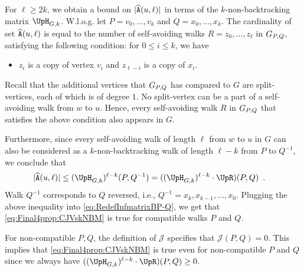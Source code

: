 \documentclass[11pt,reqno]{amsart}
\numberwithin{equation}{section}
\newcommand{\applegreen}[1]{ {\color{applegreen}#1}}
\newcommand{\amethyst}[1]{{\color{amethyst}#1} }
\newcommand{\blue}[1]{{\color{blue}#1}}
\newcommand{\bluepigment}[1]{{\color{blue(pigment)}#1}}
\newcommand{\bostonuniversityred}[1]{{\color{bostonuniversityred}#1}}
\newcommand{\capri}[1]{{\color{capri}#1}}
\newcommand{\cadmiumgreen}[1]{{\color{cadmiumgreen}#1}}
\newcommand{\electricviolet}[1]{{\color{electricviolet}#1}}
\newcommand{\goldenbrown}[1]{{\color{goldenbrown}#1}}
\newcommand{\heliotrope}[1]{{\color{heliotrope}#1}}
\newcommand{\red}[1]{{\color{red}#1}}
\newcommand{\scp}{\widehat{\tt A}}
\newcommand{\abs}[1]{\blue{|}#1\blue{|}}
\newcommand{\NBMatrix}{\cadmiumgreen{\UpH}_{G,\kk}}
\newcommand{\Invol}{\UpR}
\renewcommand{\applegreen}[1]{#1}
\renewcommand{\amethyst}[1]{#1}
\renewcommand{\blue}[1]{#1}
\renewcommand{\bluepigment}[1]{#1}
\renewcommand{\bostonuniversityred}[1]{#1}
\renewcommand{\capri}[1]{#1}
\renewcommand{\cadmiumgreen}[1]{#1}
\renewcommand{\electricviolet}[1]{#1}
\renewcommand{\goldenbrown}[1]{#1}
\renewcommand{\heliotrope}[1]{#1}
\renewcommand{\red}[1]{#1}
\newcommand{\ki}{\capri{i}}
\newcommand{\kk}{\bluepigment{k}}
\newcommand{\kell}{{\color{green(pigment)}\ell}}%
\newcommand{\kP}{\goldenbrown{P}}
\newcommand{\kQ}{\amethyst{Q}}
\newcommand{\kR}{\bostonuniversityred{R}}%
\newcommand{\ku}{\red{u}}
\newcommand{\kv}{\electricviolet{v}}
\newcommand{\kw}{\blue{w}}
\newcommand{\kx}{\heliotrope{x}}
\newcommand{\kz}{\cadmiumgreen{z}}
\renewcommand{\ki}{i}
\renewcommand{\kk}{k}
\renewcommand{\kell}{\ell}
\renewcommand{\kP}{P}
\renewcommand{\kQ}{Q}
\renewcommand{\kR}{R}
\renewcommand{\ku}{u}
\renewcommand{\kv}{v}
\renewcommand{\kw}{w}
\renewcommand{\kx}{x}
\renewcommand{\kz}{z}
\newcommand{\infmatrixB}{\mathcal{J}}
\begin{document}
For $\kell\geq 2\kk$,  we obtain a bound on $\abs{\scp(\ku,\kell)}$ in terms of the $\kk$-non-backtracking 
matrix $\NBMatrix$. 
%
W.l.o.g. let $\kP=\kv_0, \ldots, \kv_{\kk}$ and $\kQ=\kx_0,\ldots, \kx_{\kk}$. The cardinality of set $\scp(\ku,\kell)$ is 
equal to the number of self-avoiding walks $\kR=\kz_0,\ldots, \kz_{\kell}$ in $\gext{G}{\kP,\kQ}$, satisfying the following 
condition: for $0\leq i \leq \kk$, we have
\begin{itemize}
\item $\kz_{\ki}$ is a copy of vertex $\kv_{\ki}$ and $\kz_{\kell-{\ki}}$ is a copy of $\kx_{\ki}$. 
\end{itemize}
Recall that the additional vertices that $\gext{G}{\kP,\kQ}$ has compared to $G$ are split-vertices, each of which 
is of degree $1$. No split-vertex can be a part of a self-avoiding walk from $\kw$ to $\ku$.
Hence, every self-avoiding walk $\kR$ in $\gext{G}{\kP,\kQ}$ that satisfies the above condition also appears in $G$. 



Furthermore, since every self-avoiding walk of length $\kell$ from $\kw$ to $\ku$ in $G$ can also be considered as a 
$\kk$-non-backtracking walk of length $\kell-\kk$ from $\kP$ to $\kQ^{-1}$, we conclude that 
\begin{align}\nonumber
\abs{\scp(\ku,\kell)} &\leq  ( \NBMatrix )^{\kell-\kk}(\kP,\kQ^{-1}) = ( ( \NBMatrix)^{\kell-\kk} \cdot \Invol ) (\kP,\kQ) \enspace.
\end{align}
Walk $\kQ^{-1}$ corresponds to $\kQ$ reversed, i.e., $\kQ^{-1}=\kx_{\kk},\kx_{\kk-1}, \ldots, \kx_0$.
%
Plugging the above inequality into \eqref{eq:RedefInfmatrixBP-Q}, we get that \eqref{eq:Final4prop:CJVskNBM} is 
true for compatible  walks $\kP$ and $\kQ$.  


For non-compatible $\kP,\kQ$, the definition of $\infmatrixB$ specifies  that $\infmatrixB(\kP,\kQ)=0$. This implies that 
\eqref{eq:Final4prop:CJVskNBM} is true even for non-compatible  $\kP$ and $\kQ$ since we always have
$( ( \NBMatrix)^{\kell-\kk} \cdot \Invol ) (\kP,\kQ)\geq 0$. 
 
\end{document}
